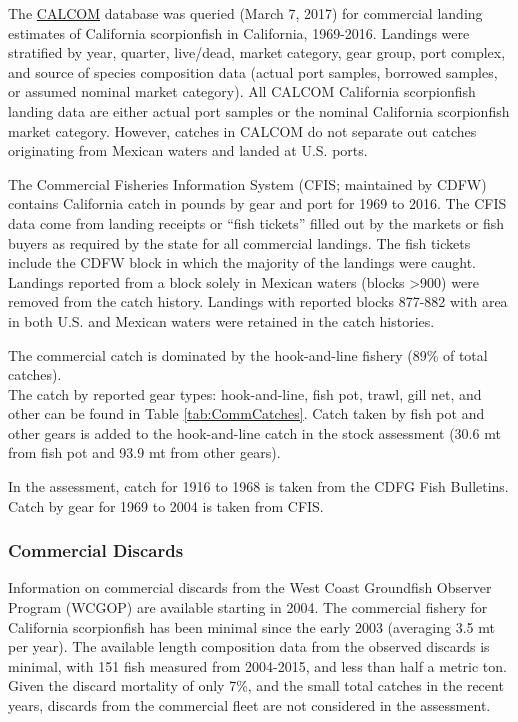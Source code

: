 \documentclass[12pt,]{article}
\begin{document}
The \href{http://128.114.3.187/}{CALCOM} database was queried (March 7,
2017) for commercial landing estimates of California scorpionfish in
California, 1969-2016. Landings were stratified by year, quarter,
live/dead, market category, gear group, port complex, and source of
species composition data (actual port samples, borrowed samples, or
assumed nominal market category). All CALCOM California scorpionfish
landing data are either actual port samples or the nominal California
scorpionfish market category. However, catches in CALCOM do not separate
out catches originating from Mexican waters and landed at U.S. ports.

The Commercial Fisheries Information System (CFIS; maintained by CDFW)
contains California catch in pounds by gear and port for 1969 to 2016.
The CFIS data come from landing receipts or ``fish tickets'' filled out
by the markets or fish buyers as required by the state for all
commercial landings. The fish tickets include the CDFW block in which
the majority of the landings were caught. Landings reported from a block
solely in Mexican waters (blocks \textgreater{}900) were removed from
the catch history. Landings with reported blocks 877-882 with area in
both U.S. and Mexican waters were retained in the catch histories.

The commercial catch is dominated by the hook-and-line fishery (89\% of
total catches).\\
The catch by reported gear types: hook-and-line, fish pot, trawl, gill
net, and other can be found in Table \ref{tab:CommCatches}. Catch taken
by fish pot and other gears is added to the hook-and-line catch in the
stock assessment (30.6 mt from fish pot and 93.9 mt from other gears).

In the assessment, catch for 1916 to 1968 is taken from the CDFG Fish
Bulletins. Catch by gear for 1969 to 2004 is taken from CFIS.

\subsubsection{Commercial Discards}\label{commercial-discards}

Information on commercial discards from the West Coast Groundfish
Observer Program (WCGOP) are available starting in 2004. The commercial
fishery for California scorpionfish has been minimal since the early
2003 (averaging 3.5 mt per year). The available length composition data
from the observed discards is minimal, with 151 fish measured from
2004-2015, and less than half a metric ton. Given the discard mortality
of only 7\%, and the small total catches in the recent years, discards
from the commercial fleet are not considered in the assessment.
\end{document}
